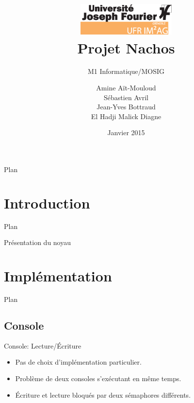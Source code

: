 \documentclass{beamer}
\title{\includegraphics[width=5cm]{LOGO_IM2AG_UJF.eps}
\\ Projet Nachos}
\subtitle{M1 Informatique/MOSIG}
\author{Amine Aït-Mouloud
\\ Sébastien Avril
\\ Jean-Yves Bottraud
\\ El Hadji Malick Diagne
}
\date{Janvier 2015}
\begin{document}
\frame{\titlepage} 

\begin{frame}{Plan}
    \tableofcontents
\end{frame}

\section{Introduction}
\begin{frame}{Plan}
    \tableofcontents[currentsection]
\end{frame}

\begin{frame}{Présentation du noyau}
\end{frame}

\section{Implémentation}
\begin{frame}{Plan}
    \tableofcontents[currentsection]
\end{frame}


\subsection{Console}

\begin{frame}{Console: Lecture/Écriture}
   \begin{itemize}
       \item Pas de choix d'implémentation particulier.
       \item Problème de deux consoles s’exécutant en même temps.
       \item Écriture et lecture bloqués par deux sémaphores différents.
   \end{itemize}
\end{frame}
\end{document}
